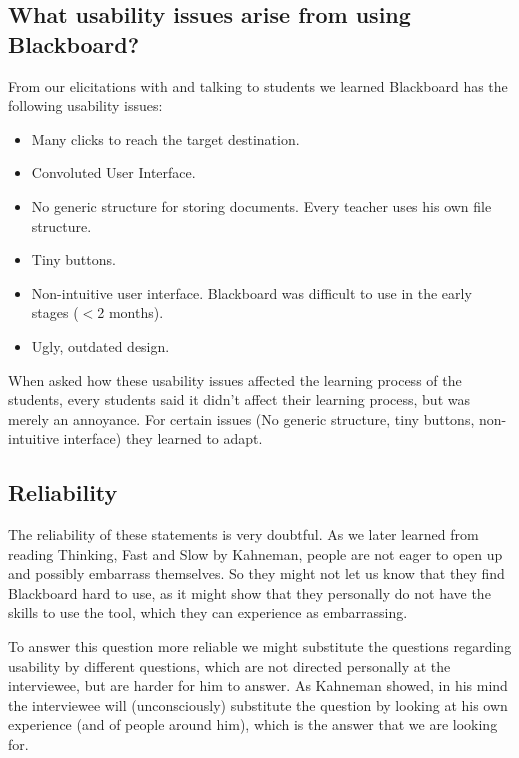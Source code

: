 \subsection{What usability issues arise from using Blackboard?}
From our elicitations with and talking to students we learned Blackboard has the following usability issues:
\begin{itemize}
	\item Many clicks to reach the target destination.
	\item Convoluted User Interface.
	\item No generic structure for storing documents. Every teacher uses his own file structure.
	\item Tiny buttons.
	\item Non-intuitive user interface. Blackboard was difficult to use in the early stages ($<$2 months).
	\item Ugly, outdated design.
\end{itemize}

When asked how these usability issues affected the learning process of the students, every students said it didn't affect their learning process, but was merely an annoyance. For certain issues (No generic structure, tiny buttons, non-intuitive interface) they learned to adapt.

\subsection{Reliability}
The reliability of these statements is very doubtful. As we later learned from reading Thinking, Fast and Slow by Kahneman, people are not eager to open up and possibly embarrass themselves. So they might not let us know that they find Blackboard hard to use, as it might show that they personally do not have the skills to use the tool, which they can experience as embarrassing.

To answer this question more reliable we might substitute the questions regarding usability by different questions, which are not directed personally at the interviewee, but are harder for him to answer. As Kahneman showed, in his mind the interviewee will (unconsciously) substitute the question by looking at his own experience (and of people around him), which is the answer that we are looking for. 


